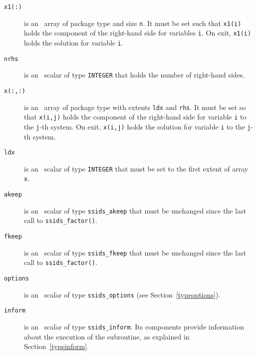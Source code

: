 \documentclass{spral}
\begin{document}
\begin{description}
\item[\texttt{x1(:)}] is an \intentinout\ array of package type and size
\texttt{n}. It must be set such that \texttt{x1(i)} holds the component of
the right-hand side for variables \texttt{i}. On exit, \texttt{x1(i)} holds the
solution for variable \texttt{i}.

\item[\texttt{nrhs}] is an \intentin\ scalar of type {\tt INTEGER} that holds
the number of right-hand sides.

\item[\texttt{x(:,:)}] is an \intentinout\ array of package type with extents
\texttt{ldx} and \texttt{rhs}. It must be set so that \texttt{x(i,j)} holds the
component of the right-hand side for variable \texttt{i} to the \texttt{j}-th
system. On exit, \texttt{x(i,j)} holds the solution for variable \texttt{i} to
the \texttt{j}-th system.

\item[\texttt{ldx}] is an \intentin\ scalar of type {\tt INTEGER} that must be
set to the first extent of array \texttt{x}.

\item[\texttt{akeep}]  is an \intentin\ scalar of type {\tt ssids\_akeep} that
must be unchanged since the last call to {\tt ssids\_factor()}.

\item[\texttt{fkeep}]  is an \intentin\ scalar of type {\tt ssids\_fkeep} that
must be unchanged since the last call to {\tt ssids\_factor()}.

\item[\texttt{options}] is an \intentin\ scalar of type {\tt ssids\_options}
(see Section~\ref{typeoptions}).

\item[\texttt{inform}] is an \intentout\ scalar of type
{\tt ssids\_inform}. Its components provide information about the execution
of the subroutine, as explained in Section~\ref{typeinform}.


\end{description}
\end{document}
